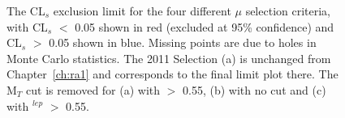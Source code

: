 \begin{figure}[htbp]
\centering
{}
\caption{\label{fig:4fit}The CL$_{s}$ exclusion limit for the four different $\mu$ selection criteria, with CL$_{s}$ $<$ 0.05 shown in red (excluded at 95\% confidence) and CL$_{s}$ $>$ 0.05 shown in blue. Missing points are due to holes in Monte Carlo statistics. The 2011 Selection (a) is unchanged from Chapter~\ref{ch:ra1} and corresponds to the final limit plot there. The M$_{T}$ cut is removed for (a) with \alt $>$ 0.55, (b) with no \alt cut and (c) with \alt$^{lep}$ $>$ 0.55.}
\end{figure}



